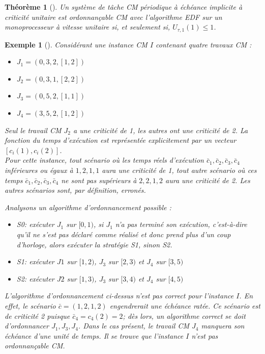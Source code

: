 \documentclass[12pt,a4paper,oneside]{book}
\theoremstyle{break}
\newtheorem{exem}{Exemple}[chapter]
\theoremstyle{breakplain}
\newtheorem{theo}{Théorème}[chapter]
\begin{document}
\begin{theo}[\cite{BaruahBDMSS11}]
Un système de tâche CM périodique à échéance implicite à criticité unitaire est ordonnançable CM avec l'algorithme EDF sur un monoprocesseur à vitesse unitaire si, et seulement si, $U_{\tau, 1}(1) \leq 1$.\\
\end{theo}

\begin{exem}[\cite{baruah2010towards}]
Considérant une instance CM $I$ contenant quatre travaux CM :
\begin{itemize}
\item $J_1 = (0,3,2,[1,2])$
\item $J_2 = (0,3,1,[2,2])$
\item $J_3 = (0,5,2,[1,1])$
\item $J_4 = (3,5,2,[1,2])$\\
\end{itemize}

Seul le travail CM $J_2$ a une criticité de 1, les autres ont une criticité de 2. La fonction du temps d'exécution est représentée explicitement par un vecteur $[c_i(1), c_i(2)]$.\\
Pour cette instance, tout scénario où les temps réels d'exécution $\bar{c}_1,\bar{c}_2,\bar{c}_3,\bar{c}_4$ inférieures ou égaux à $1,2,1,1$ aura une criticité de 1, tout autre scénario où ces temps $\bar{c}_1,\bar{c}_2,\bar{c}_3,\bar{c}_4$ ne sont pas supérieurs à $ 2,2,1,2$ aura une criticité de 2. Les autres scénarios sont, par définition, erronés.\\

\pagebreak

Analysons un algorithme d'ordonnancement possible :
\begin{itemize}
\item S0: exécuter $J_1$ sur $[0,1)$, si $J_1$ n'a pas terminé son exécution, c'est-à-dire qu'il ne s'est pas déclaré comme réalisé et donc prend plus d’un coup d'horloge, alors exécuter la stratégie S1, sinon S2.
\item S1: exécuter $J1$ sur $[1,2)$, $J_3$ sur $[2,3)$ et $J_4$ sur $[3,5)$
\item S2: exécuter $J2$ sur $[1,3)$, $J_3$ sur $[3,4)$ et $J_4$ sur $[4,5)$\\
\end{itemize}

L'algorithme d'ordonnancement ci-dessus n'est pas correct pour l'instance $I$. En effet, le scénario $\bar{c} = (1,2,1,2)$ engendrerait une échéance ratée. Ce scénario est de criticité 2 puisque $\bar{c}_4 = c_4(2) = 2$; dès lors, un algorithme correct se doit d'ordonnancer $J_1, J_3, J_4$. Dans le cas présent, le travail CM $J_4$ manquera son échéance d'une unité de temps. Il se trouve que l'instance $I$ n'est pas ordonnançable CM.
\end{exem}
\end{document}
